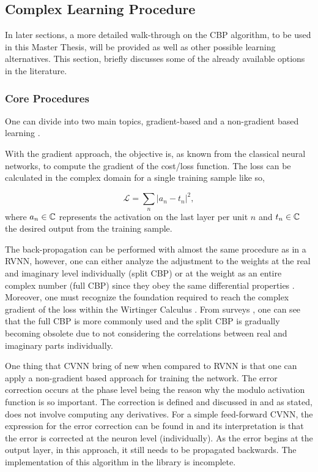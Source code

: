 \subsection{Complex Learning Procedure}

In later sections, a more detailed walk-through on the \gls{CBP} algorithm, to be used in this Master Thesis, will be provided as well as other possible learning alternatives. This section, briefly discusses some of the already available options in the literature.

\subsubsection{Core Procedures}

One can divide into two main topics, gradient-based and a non-gradient based learning \parencite{bassey2021survey, abdalla2023newtheory}.

With the gradient approach, the objective is, as known from the classical neural networks, to compute the gradient of the cost/loss function. The loss can be calculated in the complex domain for a single training sample like so,

\begin{equation}
	\mathcal{L} = \sum_n \left| a_n - t_n  \right| ^2,
\end{equation}
where $a_n \in \mathbb{ C}$ represents the activation on the last layer per unit $n$ and $t_n \in \mathbb{ C}$ the desired output from the training sample.

The back-propagation can be performed with almost the same procedure as in a \gls{RVNN}, however, one can either analyze the adjustment to the weights at the real and imaginary level individually (split \gls{CBP}) \parencite{benvenuto1992firstback} or at the weight as an entire complex number (full \gls{CBP}) since they obey the same differential properties \parencite{kim2000fully, li2006backpropold, hirose2012complex, bassey2021survey, abdalla2023newtheory}. Moreover, one must recognize the foundation required to reach the complex gradient of the loss within the Wirtinger Calculus \parencite{wirtinger1927formalen}. From surveys \parencite{bassey2021survey, lee2022survey}, one can see that the full \gls{CBP} is more commonly used and the split \gls{CBP} is gradually becoming obsolete due to not considering the correlations between real and imaginary parts individually.

One thing that CVNN bring of new when compared to RVNN is that one can apply a non-gradient based approach for training the network. The error correction occurs at the phase level being the reason why the modulo activation function is so important. The correction is defined and discussed in \parencite{aizenberg1973multivalued} and as stated, does not involve computing any derivatives. For a simple feed-forward \gls{CVNN}, the expression for the error correction can be found in \parencite{abdalla2023newtheory} and its interpretation is that the error is corrected at the neuron level (individually). As the error begins at the output layer, in this approach, it still needs to be propagated backwards. The implementation of this algorithm in the library is incomplete.

